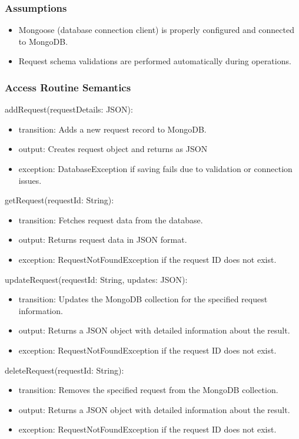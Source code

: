 \documentclass[12pt, titlepage]{article}
\begin{document}
\subsubsection{Assumptions}
\begin{itemize}
  \item Mongoose (database connection client) is properly configured and connected to MongoDB.
  \item Request schema validations are performed automatically during operations.
\end{itemize}

\subsubsection{Access Routine Semantics}

\noindent addRequest(requestDetails: JSON):
\begin{itemize}
  \item transition: Adds a new request record to MongoDB.
  \item output: Creates request object and returns as JSON
  \item exception: DatabaseException if saving fails due to validation or connection issues.
\end{itemize}

\noindent getRequest(requestId: String):
\begin{itemize}
  \item transition: Fetches request data from the database.
  \item output: Returns request data in JSON format.
  \item exception: RequestNotFoundException if the request ID does not exist.
\end{itemize}

\noindent updateRequest(requestId: String, updates: JSON):
\begin{itemize}
  \item transition: Updates the MongoDB collection for the specified request information.
  \item output: Returns a JSON object with detailed information about the result.
  \item exception: RequestNotFoundException if the request ID does not exist.
\end{itemize}

\noindent deleteRequest(requestId: String):
\begin{itemize}
  \item transition: Removes the specified request from the MongoDB collection.
  \item output: Returns a JSON object with detailed information about the result.
  \item exception: RequestNotFoundException if the request ID does not exist.
\end{itemize}
\end{document}

